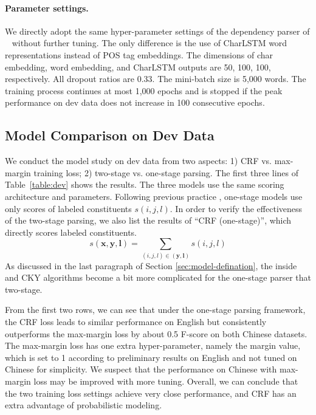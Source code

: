 \documentclass{article}
\begin{document}
\paragraph{Parameter settings.}
We directly adopt the same hyper-parameter settings of the dependency parser of \citeauthor{Timothy-d17-biaffine}~ without further tuning.
The only difference is the use of CharLSTM word representations instead of POS tag embeddings.
The dimensions of char embedding, word embedding, and CharLSTM outputs are
50, 100, 100, respectively.
All dropout ratios are 0.33.
The mini-batch size is 5,000 words.
The training process continues at most 1,000 epochs and is stopped if the peak performance on dev data does not increase in 100 consecutive epochs.








\subsection{Model Comparison on Dev Data}

We conduct the model study on dev data from two aspects: 1) CRF vs. max-margin training loss; 2) two-stage vs. one-stage parsing.
The first three lines of
Table~\ref{table:dev} shows the results.
The three models use the same scoring architecture and parameters.
Following previous practice \cite{stern-etal-2017-minimal}, one-stage models use only scores of labeled constituents $s(i,j,l)$.
In order to verify the effectiveness of the two-stage parsing, we also list the results of ``CRF (one-stage)'', which directly scores labeled constituents.
\begin{equation} \label{equation:tree-label-score}
s(\boldsymbol{x},\boldsymbol{y},\boldsymbol{l}) =
\sum_{(i,j,l) \in (\boldsymbol{y}, \boldsymbol{l})} s(i,j,l)
\end{equation}
As discussed in the last paragraph of Section \ref{sec:model-defination}, the inside and CKY algorithms become a bit more complicated for the one-stage parser that two-stage.

From the first two rows, we can see that
under the one-stage parsing framework, the CRF loss leads to similar performance on English
but consistently outperforms the max-margin loss by about 0.5 F-score on both Chinese datasets.
The max-margin loss has one extra hyper-parameter, namely the margin value, which is set to 1 according to preliminary results on English and not tuned on Chinese for simplicity.
We suspect that the performance on Chinese with max-margin loss may be improved with more tuning.
Overall, we can conclude that the two training loss settings achieve very close performance, and CRF has an extra advantage of probabilistic modeling.
\end{document}
